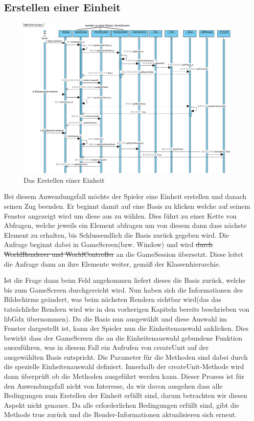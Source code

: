 \documentclass[fontsize=12pt,paper=a4,twoside]{scrartcl}
\begin{document}
\subsection{Erstellen einer Einheit}
\begin{figure}[h]
\centering
\includegraphics[width=1.0\linewidth]{sequenzdiagramm1}
\caption{Das Erstellen einer Einheit}
\label{fig:sequenzdiagramm1}
\end{figure}

Bei diesem Anwendungsfall möchte der Spieler eine Einheit erstellen und danach seinen Zug beenden.
Er beginnt damit auf eine Basis zu klicken welche auf seinem Fenster angezeigt wird um diese aus zu wählen. Dies führt zu einer Kette von Abfragen, welche jeweils ein Element abfragen um von diesem dann dass nächste Element zu erhalten, bis Schlussendlich die Basis zurück gegeben wird. Die Anfrage beginnt dabei in GameScreen(bzw. Window) und wird \sout{durch WorldRenderer und WorldController} an die GameSession übersetzt. Diese leitet die Anfrage dann an ihre Elemente weiter, gemäß der Klassenhierarchie. 

Ist die Frage dann beim Feld angekommen liefert dieses die Basis zurück, welche bis zum GameScreen durchgereicht wird. Nun haben sich die Informationen des Bildschirms geändert, was beim nächsten Rendern sichtbar wird(das das tatsächliche Rendern wird wie in den vorherigen Kapiteln bereits beschrieben von libGdx übernommen). Da die Basis nun ausgewählt und diese Auswahl im Fenster dargestellt ist, kann der Spieler nun die Einheitenauswahl anklicken. Dies bewirkt dass der GameScreen die an die Einheitenauswahl gebundene Funktion auszuführen, was in diesem Fall ein Aufrufen von createUnit auf der ausgewählten Basis entspricht. Die Parameter für die Methoden sind dabei durch die spezielle Einheitenauswahl definiert. Innerhalb der createUnit-Methode wird dann überprüft ob die Methoden ausgeführt werden kann. Dieser Prozess ist für den Anwendungsfall nicht von Interesse, da wir davon ausgehen dass alle Bedingungen zum Erstellen der Einheit erfüllt sind, darum betrachten wir diesen Aspekt nicht genauer. Da alle erforderlichen Bedingungen erfüllt sind, gibt die Methode true zurück und die Render-Informationen aktualisieren sich erneut.
\end{document}
